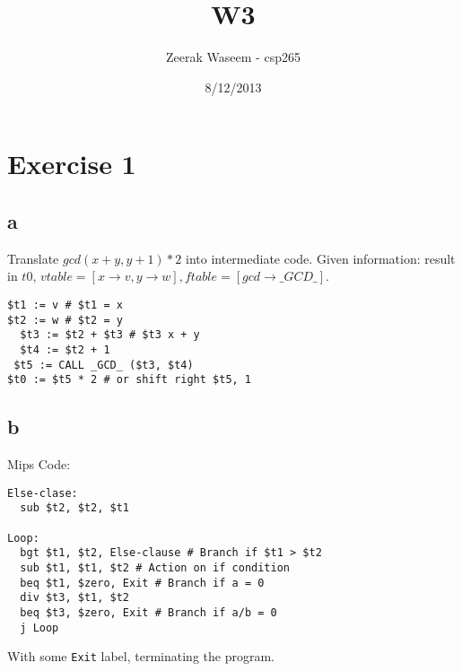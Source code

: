 \documentclass{article}
\title{W3}
\author{Zeerak Waseem - csp265}
\date{8/12/2013}
\begin{document}
\maketitle
\newpage

\section{Exercise 1}
\subsection{a}
Translate \(gcd(x+y, y+1) * 2\) into intermediate code. Given information: result in \(t0\), \(vtable = [x\rightarrow v, y\rightarrow w], ftable = [gcd\rightarrow \_GCD\_ ]\).
\begin{verbatim}
$t1 := v # $t1 = x
$t2 := w # $t2 = y
  $t3 := $t2 + $t3 # $t3 x + y
  $t4 := $t2 + 1
 $t5 := CALL _GCD_ ($t3, $t4)
$t0 := $t5 * 2 # or shift right $t5, 1
\end{verbatim}
\subsection{b}


Mips Code:
\begin{verbatim}
Else-clase:
  sub $t2, $t2, $t1

Loop:
  bgt $t1, $t2, Else-clause # Branch if $t1 > $t2
  sub $t1, $t1, $t2 # Action on if condition
  beq $t1, $zero, Exit # Branch if a = 0
  div $t3, $t1, $t2 
  beq $t3, $zero, Exit # Branch if a/b = 0
  j Loop
\end{verbatim}

\noindent With some \texttt{Exit} label, terminating the program.
\end{document}
